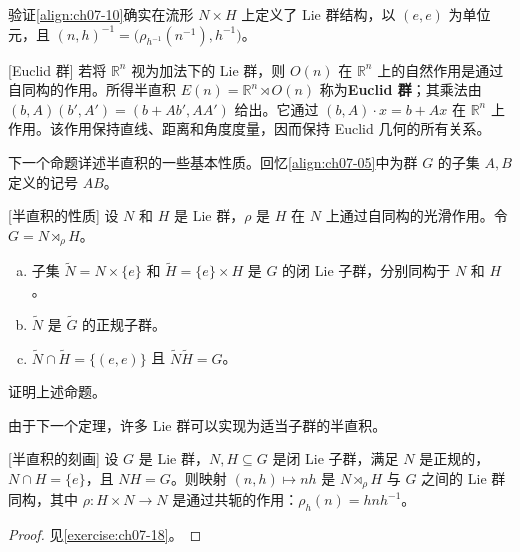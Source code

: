 \documentclass[../../main.tex]{subfiles}
\begin{document}
\begin{exercise}\label{exercise:ch07-31}
验证\eqref{align:ch07-10}确实在流形 $N\times H$ 上定义了 Lie 群结构，以 $(e,e)$ 为单位元，且 $(n,h)^{-1}=\bigl(\rho_{h^{-1}}(n^{-1}),h^{-1}\bigr)$。
\end{exercise}

\begin{example}\label{example:ch07-32}[Euclid 群]
若将 $\mathbb{R}^n$ 视为加法下的 Lie 群，则 $O(n)$ 在 $\mathbb{R}^n$ 上的自然作用是通过自同构的作用。所得半直积 $E(n)=\mathbb{R}^n\rtimes O(n)$ 称为\textbf{Euclid 群}；其乘法由 $(b,A)(b',A')=(b+Ab',AA')$ 给出。它通过 $(b,A)\cdot x=b+Ax$ 在 $\mathbb{R}^n$ 上作用。该作用保持直线、距离和角度度量，因而保持 Euclid 几何的所有关系。
\end{example}

下一个命题详述半直积的一些基本性质。回忆\eqref{align:ch07-05}中为群 $G$ 的子集 $A,B$ 定义的记号 $AB$。

\begin{proposition}\label{proposition:ch07-33}[半直积的性质]
设 $N$ 和 $H$ 是 Lie 群，$\rho$ 是 $H$ 在 $N$ 上通过自同构的光滑作用。令 $G=N\rtimes_\rho H$。
\begin{enumerate}[(a)]
\item 子集 $\widetilde{N}=N\times\{e\}$ 和 $\widetilde{H}=\{e\}\times H$ 是 $G$ 的闭 Lie 子群，分别同构于 $N$ 和 $H$。
\item $\widetilde{N}$ 是 $\widetilde{G}$ 的正规子群。
\item $\widetilde{N}\cap\widetilde{H}=\{(e,e)\}$ 且 $\widetilde{N}\widetilde{H}=G$。
\end{enumerate}
\end{proposition}

\begin{exercise}\label{exercise:ch07-34}
证明上述命题。
\end{exercise}

由于下一个定理，许多 Lie 群可以实现为适当子群的半直积。

\begin{theorem}\label{theorem:ch07-35}[半直积的刻画]
设 $G$ 是 Lie 群，$N,H\subseteq G$ 是闭 Lie 子群，满足 $N$ 是正规的，$N\cap H=\{e\}$，且 $NH=G$。则映射 $(n,h)\mapsto nh$ 是 $N\rtimes_\rho H$ 与 $G$ 之间的 Lie 群同构，其中 $\rho\colon H\times N\to N$ 是通过共轭的作用：$\rho_h(n)=hnh^{-1}$。
\end{theorem}

\begin{proof}
见\cref{exercise:ch07-18}。
\end{proof}
\end{document}
